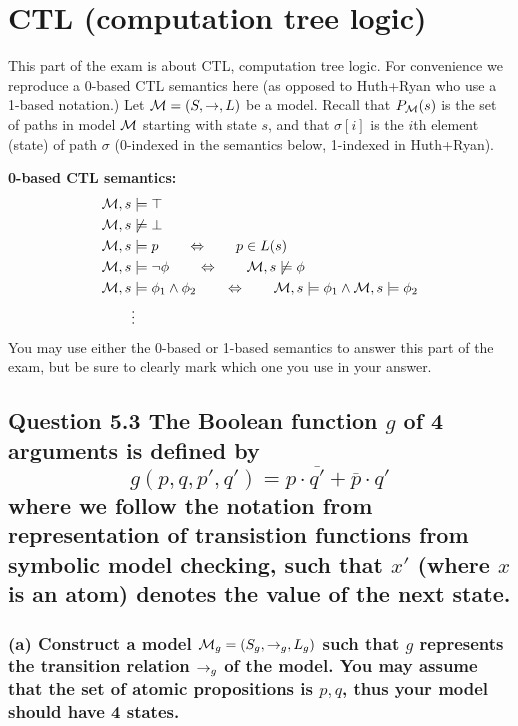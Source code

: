 \section{CTL (computation tree logic)}
This part of the exam is about CTL, computation tree logic. For convenience
we reproduce a 0-based CTL semantics here (as opposed to Huth+Ryan who use a
1-based notation.) Let ${\cal M} = (S,\to,L)$ be a model. Recall that
$P_{\cal M}(s)$ is the set of paths in model ${\cal M}$ starting with state
$s$, and that $\sigma[i]$ is the $i$th element (state) of path $\sigma$
(0-indexed in the semantics below, 1-indexed in Huth+Ryan).

{\bf 0-based CTL semantics:}
\begin{align*}
	{\cal M}, s &\models \top \\
	{\cal M}, s &\not\models \bot \\
	{\cal M}, s &\models p \qquad\Leftrightarrow\qquad p \in L(s) \\
	{\cal M}, s &\models \neg\phi \qquad\Leftrightarrow\qquad
		{\cal M}, s \not\models \phi \\
	{\cal M}, s &\models \phi_1 \land \phi_2 \qquad\Leftrightarrow\qquad
		{\cal M}, s \models \phi_1 \land {\cal M}, s \models \phi_2 \\
	&\vdots
\end{align*}
You may use either the 0-based or 1-based semantics to answer this part of the
exam, but be sure to clearly mark which one you use in your answer.

\subsection*{Question 5.3 \mdseries The Boolean function $g$ of 4 arguments
is defined by \[g(p,q,p',q') = p \cdot \overline{q'} + \overline{p} \cdot q'\]
where we follow the notation from representation of transistion functions from
symbolic model checking, such that $x'$ (where $x$ is an atom) denotes the
value of the next state.}
\subsubsection*{(a) \mdseries Construct a model ${\cal M}_g =
(S_g, \to_g, L_g)$ such that $g$ represents the transition relation $\to_g$
of the model. You may assume that the set of atomic propositions is ${p, q}$,
thus your model should have 4 states.}

